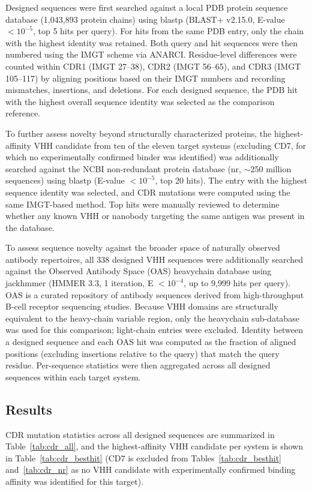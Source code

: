 \documentclass[11pt]{article}
\begin{document}
Designed sequences were first searched against a local PDB protein sequence database (1,043,893 protein
chains) using blastp (BLAST+ v2.15.0, E-value $< 10^{-5}$, top 5 hits per query). For hits from the same PDB entry,
only the chain with the highest identity was retained. Both query and hit sequences were then numbered
using the IMGT scheme via ANARCI. Residue-level differences were counted within CDR1 (IMGT 27--38),
CDR2 (IMGT 56--65), and CDR3 (IMGT 105--117) by aligning positions based on their IMGT numbers and
recording mismatches, insertions, and deletions. For each designed sequence, the PDB hit with the highest
overall sequence identity was selected as the comparison reference.

To further assess novelty beyond structurally characterized proteins, the highest-affinity VHH candidate
from ten of the eleven target systems (excluding CD7, for which no experimentally confirmed binder was
identified) was additionally searched against the NCBI non-redundant protein database (nr, $\sim$250 million
sequences) using blastp (E-value $< 10^{-5}$, top 20 hits). The entry with the highest sequence identity was
selected, and CDR mutations were computed using the same IMGT-based method. Top hits were manually
reviewed to determine whether any known VHH or nanobody targeting the same antigen was present in the
database.

To assess sequence novelty against the broader space of naturally observed antibody repertoires, all 338
designed VHH sequences were additionally searched against the Observed Antibody Space (OAS) heavychain database using jackhmmer (HMMER 3.3, 1 iteration, E $< 10^{-4}$, up to 9,999 hits per query). OAS is a
curated repository of antibody sequences derived from high-throughput B-cell receptor sequencing studies.
Because VHH domains are structurally equivalent to the heavy-chain variable region, only the heavychain sub-database was used for this comparison; light-chain entries were excluded. Identity between a
designed sequence and each OAS hit was computed as the fraction of aligned positions (excluding insertions
relative to the query) that match the query residue. Per-sequence statistics were then aggregated across all
designed sequences within each target system.

\subsection{Results}
CDR mutation statistics across all designed sequences are summarized in Table~\ref{tab:cdr_all}, and the highest-affinity
VHH candidate per system is shown in Table~\ref{tab:cdr_besthit} (CD7 is excluded from Tables~\ref{tab:cdr_besthit} and~\ref{tab:cdr_nr} as no VHH candidate
with experimentally confirmed binding affinity was identified for this target).
\end{document}
